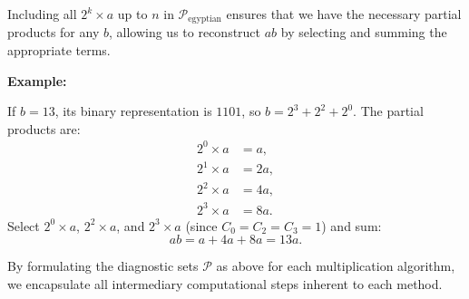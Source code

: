 \documentclass[11pt]{article}
\begin{document}
Including all $2^k \times a$ up to $n$ in $\mathcal{P}_{\text{egyptian}}$ ensures that we have the necessary partial products for any $b$, allowing us to reconstruct $ab$ by selecting and summing the appropriate terms.

\textbf{Example:}

If $b = 13$, its binary representation is $1101$, so $b = 2^3 + 2^2 + 2^0$. The partial products are:
\begin{align*}
2^0 \times a &= a, \\
2^1 \times a &= 2a, \\
2^2 \times a &= 4a, \\
2^3 \times a &= 8a.
\end{align*}
Select $2^0 \times a$, $2^2 \times a$, and $2^3 \times a$ (since $C_0 = C_2 = C_3 = 1$) and sum:
\[
ab = a + 4a + 8a = 13a.
\]

By formulating the diagnostic sets $\mathcal{P}$ as above for each multiplication algorithm, we encapsulate all intermediary computational steps inherent to each method.
\end{document}
